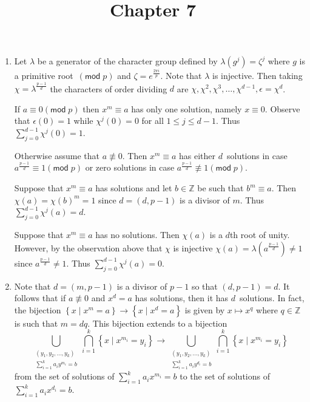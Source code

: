 \documentclass[12pt]{article}
\title{Chapter 7}
\author{}\date{}
\renewcommand{\pmod}[1]{\left(\mathsf{mod}\;#1\right)}
\begin{document}
\maketitle

\begin{enumerate}
\item %

Let $\lambda$ be a generator of the character group
defined by $\lambda\left(g^j\right)=\zeta^j$
where $g$ is a primitive root~$\pmod{p}$
and $\zeta=e^{\frac{2\pi i}{p}}$.
Note that $\lambda$ is injective.
Then taking $\chi=\lambda^{\frac{p-1}{d}}$ the characters
of order dividing $d$ are
$\chi,\chi^2,\chi^3,\ldots,\chi^{d-1},\epsilon=\chi^d$.

If $a\equiv 0\pmod{p}$ then $x^m\equiv a$ has
only one solution, namely $x\equiv 0$.
Observe that $\epsilon\left(0\right)=1$ while
$\chi^j\left(0\right)=0$ for all $1\le j\le d-1$.
Thus $\sum_{j=0}^{d-1}\chi^j\left(0\right)=1$.

Otherwise assume that $a\not\equiv 0$.
Then $x^m\equiv a$ has either $d$~solutions
in case $a^{\frac{p-1}{d}}\equiv 1\pmod{p}$ or
zero solutions in case $a^{\frac{p-1}{d}}\not\equiv 1\pmod{p}$.

Suppose that $x^m\equiv a$ has solutions and let $b\in\mathbb{Z}$
be such that $b^m\equiv a$.
Then $\chi\left(a\right)=\chi\left(b\right)^m=1$ since
$d=\left(d,p-1\right)$ is a divisor of $m$. Thus
$\sum_{j=0}^{d-1}\chi^j\left(a\right)=d$.

Suppose that $x^m\equiv a$ has no solutions.
Then $\chi\left(a\right)$ is a $d$th root of unity.
However, by the observation above that $\chi$
is injective $\chi\left(a\right)
=\lambda\left(a^{\frac{p-1}{d}}\right)\ne 1$
since $a^{\frac{p-1}{d}}\ne 1$.
Thus $\sum_{j=0}^{d-1}\chi^j\left(a\right)=0$.

\item %
Note that $d=\left(m,p-1\right)$ is a divisor
of $p-1$ so that $\left(d,p-1\right)=d$.
It follows that if $a\not\equiv 0$ and
$x^d=a$ has solutions, then it has $d$~solutions.
In fact, the bijection $\left\{x\mid x^m=a\right\}\to
\left\{x\mid x^d=a\right\}$ is given by $x\mapsto x^q$
where $q\in\mathbb{Z}$ is such that $m=dq$.
This bijection extends to a bijection
\[\bigcup_{\substack{\left(y_1,y_2,\ldots,y_k\right)\\
\sum_{i=1}^ka_iy^{m_i}=b}}
\bigcap_{i=1}^k\left\{x\mid x^{m_i}=y_i\right\}
\longrightarrow\bigcup_{\substack{\left(y_1,y_2,\ldots,y_k\right)\\
\sum_{i=1}^ka_iy^{d_i}=b}}
\bigcap_{i=1}^k\left\{x\mid x^{m_i}=y_i\right\}\]
from the set of solutions of $\sum_{i=1}^ka_ix^{m_i}=b$
to the set of solutions of $\sum_{i=1}^ka_ix^{d_i}=b$.


\end{enumerate}
\end{document}
